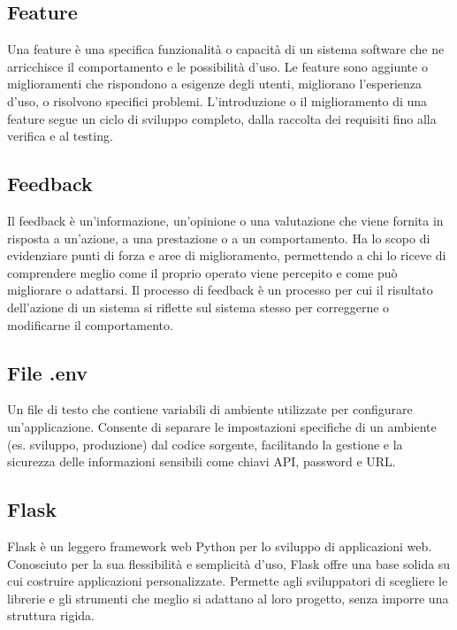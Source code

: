 \hypertarget{sec:feature}{}
\subsection*{Feature}
Una feature è una specifica funzionalità o capacità di un sistema software che ne arricchisce il comportamento e le possibilità d'uso. Le feature sono 
aggiunte o miglioramenti che rispondono a esigenze degli utenti, migliorano l’esperienza d’uso, o risolvono specifici problemi. L'introduzione o il 
miglioramento di una feature segue un ciclo di sviluppo completo, dalla raccolta dei requisiti fino alla verifica e al testing.

\hypertarget{sec:feedback}{}
\subsection*{Feedback}
Il feedback è un'informazione, un'opinione o una valutazione che viene fornita in risposta a un'azione, a una prestazione o a un 
comportamento. Ha lo scopo di evidenziare punti di forza e aree di miglioramento, permettendo a chi lo riceve di comprendere meglio come il 
proprio operato viene percepito e come può migliorare o adattarsi. Il processo di feedback è un processo per cui il risultato dell’azione 
di un sistema si riflette sul sistema stesso per correggerne o modificarne il comportamento.

\hypertarget{sec:file-.env}{}
\subsection*{File .env}
Un file di testo che contiene variabili di ambiente utilizzate per configurare un'applicazione. Consente di separare le impostazioni 
specifiche di un ambiente (es. sviluppo, produzione) dal codice sorgente, facilitando la gestione e la sicurezza delle informazioni 
sensibili come chiavi API, password e URL.

\hypertarget{sec:flask}{}
\subsection*{Flask}
Flask è un leggero framework web Python per lo sviluppo di applicazioni web. Conosciuto per la sua flessibilità e semplicità d'uso, 
Flask offre una base solida su cui costruire applicazioni personalizzate. Permette agli sviluppatori di scegliere le librerie e gli 
strumenti che meglio si adattano al loro progetto, senza imporre una struttura rigida.

